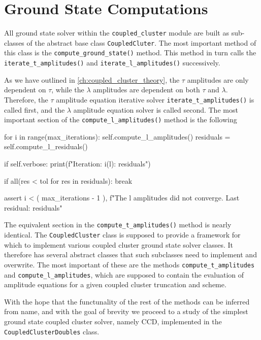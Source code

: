 \section{Ground State Computations}

    All ground state solver within the \lstinline{coupled_cluster} module are built 
    as sub-classes of the abstract base class \lstinline{CoupledCluter}. The most
    important method of this class is the \lstinline{compute_ground_state()} method.
    This method in turn calls the \lstinline{iterate_t_amplitudes()} and 
    \lstinline{iterate_l_amplitudes()} successively. 

    

    As we have outlined in 
    \autoref{ch:coupled_cluster_theory}, the $\tau$ amplitudes are only dependent on 
    $\tau$, while the $\lambda$ amplitudes are dependent on both $\tau$ and $\lambda$.
    Therefore, the $\tau$ amplitude equation iterative solver
    \lstinline{iterate_t_amplitudes()} is called first, and the $\lambda$ amplitude
    equation solver is called second.
    The most important section of the \lstinline{compute_l_amplitudes()} method 
    is the following
    \begin{python}
    for i in range(max_iterations):
    self.compute_l_amplitudes()
    residuals = self.compute_l_residuals()

    if self.verbose:
        print(f"Iteration: {i}\tResiduals (l): {residuals}")

    if all(res < tol for res in residuals):
        break

    assert i < (
        max_iterations - 1
    ), f"The l amplitudes did not converge. Last residual: {residuals}" 
    \end{python}
    The equivalent section in the \lstinline{compute_t_amplitudes()} method is nearly
    identical.
    The \lstinline{CoupledCluster} class is supposed to provide a framework for which 
    to implement various coupled cluster ground state solver classes. It therefore
    has several abstract classes that such subclasses need to implement and overwrite.
    The most important of these are the methods \lstinline{compute_t_amplitudes} 
    and \lstinline{compute_l_amplitudes}, which are supposed to contain the evaluation 
    of amplitude equations for a given coupled cluster truncation and scheme. 

    With the hope that the functunality of the rest of the methods can be inferred from 
    name, and with the goal of brevity we proceed to a study of the simplest 
    ground state coupled cluster solver, namely CCD, implemented in the 
    \lstinline{CoupledClusterDoubles} class.
   
